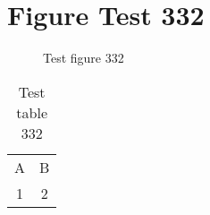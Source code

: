 \documentclass{article}
\begin{document}
\section{Figure Test 332}
\begin{figure}[h]
\caption{Test figure 332}
\end{figure}
\begin{table}[h]
\caption{Test table 332}
\begin{tabular}{cc}
A & B \\
1 & 2
\end{tabular}
\end{table}
\end{document}

